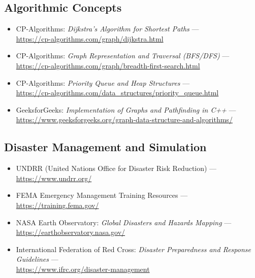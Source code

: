 \documentclass[12pt,a4paper]{report}
\begin{document}
\subsection*{Algorithmic Concepts}
\begin{itemize}
    \item CP-Algorithms: \textit{Dijkstra's Algorithm for Shortest Paths} — \\ 
    \url{https://cp-algorithms.com/graph/dijkstra.html}
    \item CP-Algorithms: \textit{Graph Representation and Traversal (BFS/DFS)} — \\ 
    \url{https://cp-algorithms.com/graph/breadth-first-search.html}
    \item CP-Algorithms: \textit{Priority Queue and Heap Structures} — \\ 
    \url{https://cp-algorithms.com/data_structures/priority_queue.html}
    \item GeeksforGeeks: \textit{Implementation of Graphs and Pathfinding in C++} — \\
    \url{https://www.geeksforgeeks.org/graph-data-structure-and-algorithms/}
\end{itemize}

\subsection*{Disaster Management and Simulation}
\begin{itemize}
    \item UNDRR (United Nations Office for Disaster Risk Reduction) — \\ 
    \url{https://www.undrr.org/}
    \item FEMA Emergency Management Training Resources — \\ 
    \url{https://training.fema.gov/}
    \item NASA Earth Observatory: \textit{Global Disasters and Hazards Mapping} — \\ 
    \url{https://earthobservatory.nasa.gov/}
    \item International Federation of Red Cross: \textit{Disaster Preparedness and Response Guidelines} — \\
    \url{https://www.ifrc.org/disaster-management}
\end{itemize}
\end{document}
